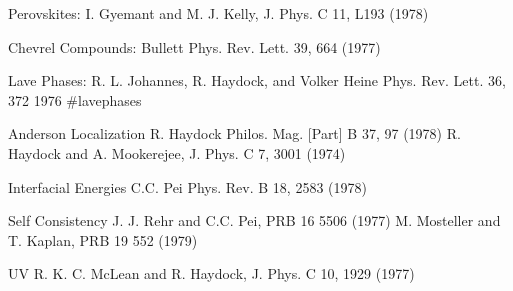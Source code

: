 Perovskites:
I. Gyemant and M. J. Kelly, J. Phys. C 11, L193 (1978)

Chevrel Compounds:
Bullett Phys. Rev. Lett. 39, 664 (1977)

Lave Phases:
R. L. Johannes, R. Haydock, and Volker Heine Phys. Rev. Lett. 36, 372 1976 #lavephases

Anderson Localization
R. Haydock Philos. Mag. [Part] B 37, 97 (1978)
R. Haydock and A. Mookerejee, J. Phys. C 7, 3001 (1974)

Interfacial Energies
C.C. Pei Phys. Rev. B 18, 2583 (1978)

Self Consistency
J. J. Rehr and C.C. Pei, PRB 16 5506 (1977)
M. Mosteller and T. Kaplan,  PRB 19 552 (1979)

UV
R. K. C. McLean and R. Haydock, J. Phys. C 10, 1929 (1977)

